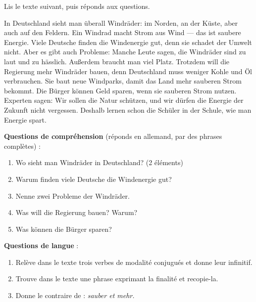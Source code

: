 \documentclass[11pt]{article}
\newcommand{\all}[1]{\ifmmode\text{\textit{#1}}\else\begingroup\selectlanguage{ngerman}\itshape #1\endgroup\fi}
\begin{document}
\begin{exercice}
Lis le texte suivant, puis réponds aux questions.

\begin{textebox}
In Deutschland sieht man überall Windräder: im Norden, an der Küste, aber auch auf den Feldern. Ein Windrad macht Strom aus Wind — das ist saubere Energie. Viele Deutsche finden die Windenergie gut, denn sie schadet der Umwelt nicht. Aber es gibt auch Probleme: Manche Leute sagen, die Windräder sind zu laut und zu hässlich. Außerdem braucht man viel Platz. Trotzdem will die Regierung mehr Windräder bauen, denn Deutschland muss weniger Kohle und Öl verbrauchen. Sie baut neue Windparks, damit das Land mehr sauberen Strom bekommt. Die Bürger können Geld sparen, wenn sie sauberen Strom nutzen. Experten sagen: Wir sollen die Natur schützen, und wir dürfen die Energie der Zukunft nicht vergessen. Deshalb lernen schon die Schüler in der Schule, wie man Energie spart.
\end{textebox}

\textbf{Questions de compréhension} (réponds en allemand, par des phrases complètes) :
\begin{enumerate}
\item Wo sieht man Windräder in Deutschland? (2 éléments)
\item Warum finden viele Deutsche die Windenergie gut?
\item Nenne zwei Probleme der Windräder.
\item Was will die Regierung bauen? Warum?
\item Was können die Bürger sparen?
\end{enumerate}

\textbf{Questions de langue} :
\begin{enumerate}
\item[6.] Relève dans le texte trois verbes de modalité conjugués et donne leur infinitif.
\item[7.] Trouve dans le texte une phrase exprimant la finalité et recopie-la.
\item[8.] Donne le contraire de : \all{sauber} et \all{mehr}.
\end{enumerate}
\end{exercice}
\end{document}
